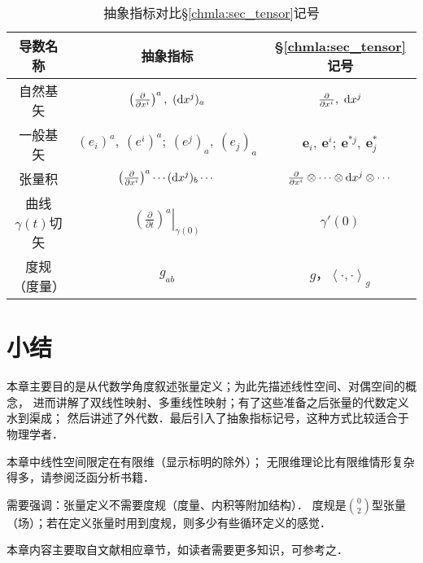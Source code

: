\begin{table}[htb]
    \centering
    \caption{抽象指标对比\S\ref{chmla:sec_tensor}记号} \label{chmla:tab-aivscc}
    \begin{tabular}{|*3{c|}}
        \hline
        导数名称 & 抽象指标 & \S\ref{chmla:sec_tensor}记号 \\ 
        \hline
        自然基矢 & $\left(\frac{\partial}{\partial x^i} \right)^a,\  ({\rm d}x^j)_a$ 
                 & $\frac{\partial}{\partial x^i}, \  {\rm d}x^j$    \\ 
        \hline
        一般基矢 & $(e_i)^a,\ (e^i)^a;\ (e^j)_a,\ (e_j)_a$ &  $\boldsymbol{e}_i,\ \boldsymbol{e}^i;\ 
        \boldsymbol{e}^{*j},\  \boldsymbol{e}^{*}_{j} $    \\ 
        \hline
        张量积   & $\left(\frac{\partial}{\partial x^i} \right)^a \cdots ({\rm d}x^j)_b \cdots $ 
                   &  $\frac{\partial}{\partial x^i}\otimes \cdots\otimes
                   {\rm d}x^j \otimes \cdots$    \\ 
        \hline        
        曲线$\gamma(t)$切矢 & $\left.\left(\frac{\partial}{\partial t} \right)^a \right|_{\gamma(0)} $ 
          & $\gamma'(0)$  \\ 
        \hline
        度规（度量） & $g_{ab}$ & $g$，$\left<\cdot ,\cdot \right>_{g}$ \\ \hline
    \end{tabular}
\end{table}



\section*{小结}


本章主要目的是从代数学角度叙述张量定义；为此先描述线性空间、对偶空间的概念，
进而讲解了双线性映射、多重线性映射；有了这些准备之后张量的代数定义水到渠成；
然后讲述了外代数．最后引入了抽象指标记号，这种方式比较适合于物理学者．

本章中线性空间限定在有限维（显示标明的除外）；
无限维理论比有限维情形复杂得多，请参阅泛函分析书籍．

需要强调：张量定义不需要度规（度量、内积等附加结构）．
度规是$\binom{0}{2}$型张量（场）；若在定义张量时用到度规，则多少有些循环定义的感觉．

本章内容主要取自文献\parencite{qiuws-2019-v2}相应章节，如读者需要更多知识，可参考之．

\printbibliography[heading=subbibliography,title=第\ref{chmla}章参考文献]
\endinput


